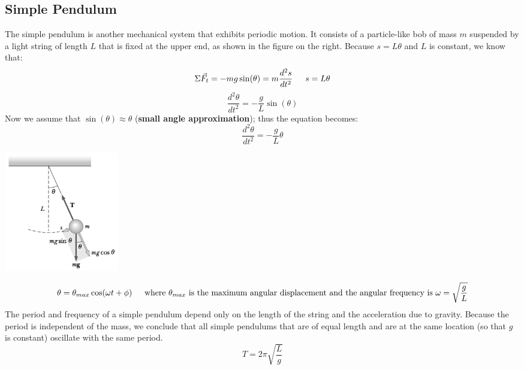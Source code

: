 \documentclass{article}
\begin{document}
	\subsection{Simple Pendulum}
    	\begin{multicols}{2}
        	The simple pendulum is another mechanical system that exhibits periodic motion. It consists of a particle-like bob of mass $m$ suspended by a light string of length $L$ that is fixed at the upper end, as shown in the figure on the right. Because $s=L\theta$ and $L$ is constant, we know that:
            \[
            	\Sigma\vec{F}_t=-mg\sin(\theta)=m\frac{d^2s}{dt^2} \indent
                s=L\theta
            \]
            \[
            	\frac{d^2\theta}{dt^2}=-\frac{g}{L}\sin(\theta)
            \]
            Now we assume that $\sin(\theta)\approx\theta$ (\textbf{small angle approximation}); thus the equation becomes:
            \[
            	\frac{d^2\theta}{dt^2}=-\frac{g}{L}\theta
			\]
		\columnbreak
        	\centerline{\includegraphics[width=5cm]{simPen.png}}
        \end{multicols}
        \[
			\theta=\theta_{max}\cos(\omega t+\phi) \indent
			\text{where $\theta_{max}$ is the maximum angular displacement and the angular frequency is $\omega=\sqrt{\frac{g}{L}}$}
		\]
        The period and frequency of a simple pendulum depend only on the length of the string and the acceleration due to gravity. Because the period is independent of the mass, we conclude that all simple pendulums that are of equal length and are at the same location (so that $g$ is constant) oscillate with the same period.
        \[
        	T=2\pi\sqrt{\frac{L}{g}}
        \]
        
\end{document}
